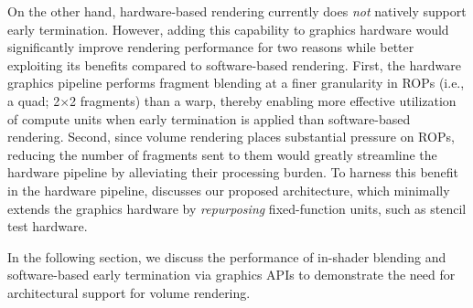On the other hand, hardware-based rendering currently does \emph{not} natively
support early termination. However, adding this capability to graphics hardware
would significantly improve rendering performance for two reasons while better
exploiting its benefits compared to software-based rendering.
%
First, the hardware graphics pipeline performs fragment blending at a finer
granularity in ROPs (i.e., a quad; 2$\times$2 fragments) than a warp, thereby
enabling more effective utilization of compute units when early termination is
applied than software-based rendering.
% 
Second, since volume rendering places substantial pressure on ROPs, reducing
the number of fragments sent to them would greatly streamline the hardware
pipeline by alleviating their processing burden.
%
To harness this benefit in the hardware pipeline, 
discusses our proposed architecture, which minimally extends the graphics
hardware by \emph{repurposing} fixed-function units, such as stencil test
hardware.

In the following section, we discuss the performance of in-shader blending and
software-based early termination via graphics APIs to demonstrate the need for
architectural support for volume rendering.
